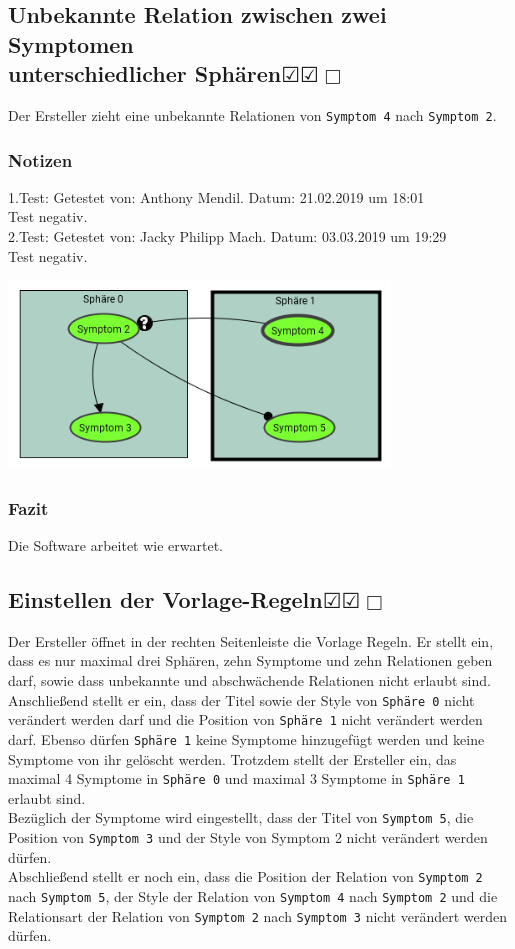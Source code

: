 \documentclass[enabledeprecatedfontcommands]{scrartcl}
\newcommand{\subsectiont}[2]{\subsection[#1]{#1{\normalsize\normalfont #2}}}
\newcommand{\leer}{$\Box$}
\newcommand{\ok}{$\CheckedBox$}
\begin{document}
\subsectiont{Unbekannte Relation zwischen zwei Symptomen\\ unterschiedlicher Sphären}{\dotfill\ok\ok\leer}
Der Ersteller zieht eine unbekannte Relationen von \texttt{Symptom 4} nach \texttt{Symptom 2}. 
\subsubsection{Notizen}
1.Test: Getestet von: Anthony Mendil. Datum: 21.02.2019 um 18:01 \\
Test negativ.\\
2.Test: Getestet von: Jacky Philipp Mach. Datum: 03.03.2019 um 19:29 \\
Test negativ.
\begin{center}
\includegraphics[height=5cm]{1_11.PNG}
\end{center}
\subsubsection{Fazit}
Die Software arbeitet wie erwartet.

\subsectiont{Einstellen der Vorlage-Regeln}{\dotfill\ok\ok\leer}
Der Ersteller öffnet in der rechten Seitenleiste die Vorlage Regeln. Er stellt ein, dass es nur maximal drei Sphären, zehn Symptome und zehn Relationen geben darf, sowie dass unbekannte und abschwächende Relationen nicht erlaubt sind. \\
Anschließend stellt er ein, dass der Titel sowie der Style von \texttt{Sphäre 0} nicht verändert werden darf und die Position von \texttt{Sphäre 1} nicht verändert werden darf. Ebenso dürfen \texttt{Sphäre 1} keine Symptome hinzugefügt werden und keine Symptome von ihr gelöscht werden. Trotzdem stellt der Ersteller
ein, das maximal 4 Symptome in \texttt{Sphäre 0} und maximal 3 Symptome in \texttt{Sphäre 1} erlaubt sind. \\
Bezüglich der Symptome wird eingestellt, dass der Titel von \texttt{Symptom 5}, die Position von \texttt{Symptom 3} und der Style von {Symptom 2} nicht verändert werden dürfen. \\
Abschließend stellt er noch ein, dass die Position der Relation von \texttt{Symptom 2} nach \texttt{Symptom 5}, der Style der Relation von \texttt{Symptom 4} nach \texttt{Symptom 2} und die Relationsart der Relation von \texttt{Symptom 2} nach \texttt{Symptom 3} nicht verändert werden dürfen. 
\end{document}
